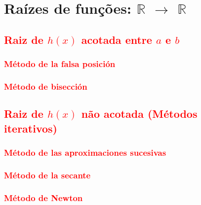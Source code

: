 
\chapter{Raízes de funções: $\mathbb{R}$ $\rightarrow$ $\mathbb{R}$}

\section{ \textcolor{red}{Raiz de $h(x)$  acotada entre $a$ e $b$} }

\subsection{ \textcolor{red}{Método de la falsa posición} }

\subsection{ \textcolor{red}{Método de bisección} }



\section{ \textcolor{red}{Raiz de $h(x)$  não acotada (Métodos iterativos)} }

\subsection{ \textcolor{red}{Método de las aproximaciones sucesivas} }

\subsection{ \textcolor{red}{Método de la secante} }

\subsection{ \textcolor{red}{Método de Newton} }

